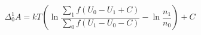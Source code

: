 


\[ \Delta_0^1 A = kT \left( \ln\frac{\sum_1 f(U_0 - U_1 + C)}{\sum_0
    f(U_1 - U_0 - C)} - \ln\frac{n_1}{n_0} \right) + C \]


